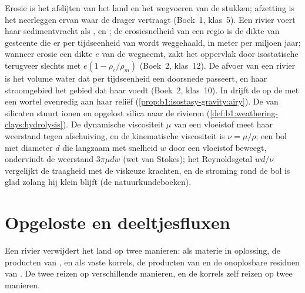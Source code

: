 \begin{recall}
Erosie is het afslijten van het land en het wegvoeren van de stukken; afzetting is het neerleggen ervan waar de drager vertraagt (Boek~1, klas~5). Een rivier voert haar sedimentvracht als ,  en ; de erosiesnelheid van een regio is de dikte van gesteente die er per tijdseenheid van wordt weggehaald, in meter per miljoen jaar; wanneer erosie een dikte $e$ van de  wegneemt, zakt het oppervlak door isostatische terugveer slechts met $e(1 - \rho_c/\rho_m)$ (Boek~2, klas~12). De afvoer van een rivier is het volume water dat per tijdseenheid een doorsnede passeert, en haar stroomgebied het gebied dat haar voedt (Boek~2, klas~10). In  drijft de  op de  met een wortel evenredig aan haar reliëf (\cref{prop:b1:isostasy-gravity:airy}). De  van silicaten stuurt ionen en opgelost silica naar de rivieren (\cref{def:b1:weathering-clays:hydrolysis}). De dynamische viscositeit $\mu$ van een vloeistof meet haar weerstand tegen afschuiving, en de kinematische viscositeit is $\nu = \mu/\rho$; een bol met diameter $d$ die langzaam met snelheid $w$ door een vloeistof beweegt, ondervindt de weerstand $3\pi\mu d w$ (wet van Stokes); het Reynoldsgetal $w d/\nu$ vergelijkt de traagheid met de viskeuze krachten, en de stroming rond de bol is glad zolang hij klein blijft (de natuurkundeboeken).
\end{recall}

\section{Opgeloste en deeltjesfluxen}\label{sec:b1:erosion-transport:fluxes}

Een rivier verwijdert het land op twee manieren: als materie in oplossing, de producten van , en als vaste korrels, de producten van  en de onoplosbare residuen van . De twee reizen op verschillende manieren, en de korrels zelf reizen op twee manieren.

